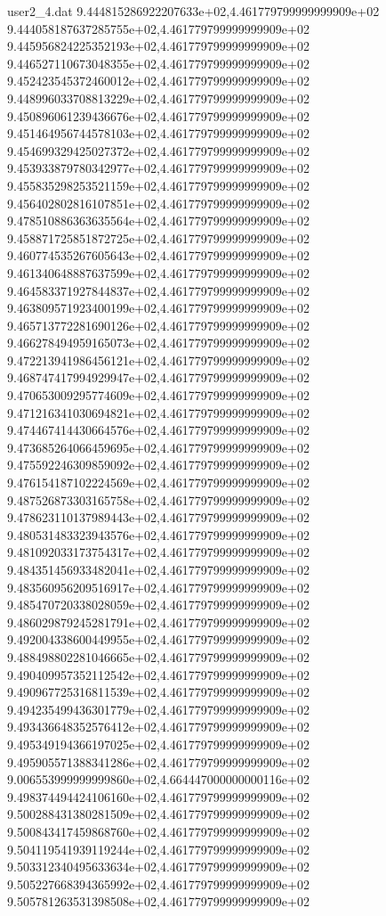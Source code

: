 \begin{filecontents}{user2_4.dat}
9.444815286922207633e+02,4.461779799999999909e+02
9.444058187637285755e+02,4.461779799999999909e+02
9.445956824225352193e+02,4.461779799999999909e+02
9.446527110673048355e+02,4.461779799999999909e+02
9.452423545372460012e+02,4.461779799999999909e+02
9.448996033708813229e+02,4.461779799999999909e+02
9.450896061239436676e+02,4.461779799999999909e+02
9.451464956744578103e+02,4.461779799999999909e+02
9.454699329425027372e+02,4.461779799999999909e+02
9.453933879780342977e+02,4.461779799999999909e+02
9.455835298253521159e+02,4.461779799999999909e+02
9.456402802816107851e+02,4.461779799999999909e+02
9.478510886363635564e+02,4.461779799999999909e+02
9.458871725851872725e+02,4.461779799999999909e+02
9.460774535267605643e+02,4.461779799999999909e+02
9.461340648887637599e+02,4.461779799999999909e+02
9.464583371927844837e+02,4.461779799999999909e+02
9.463809571923400199e+02,4.461779799999999909e+02
9.465713772281690126e+02,4.461779799999999909e+02
9.466278494959165073e+02,4.461779799999999909e+02
9.472213941986456121e+02,4.461779799999999909e+02
9.468747417994929947e+02,4.461779799999999909e+02
9.470653009295774609e+02,4.461779799999999909e+02
9.471216341030694821e+02,4.461779799999999909e+02
9.474467414430664576e+02,4.461779799999999909e+02
9.473685264066459695e+02,4.461779799999999909e+02
9.475592246309859092e+02,4.461779799999999909e+02
9.476154187102224569e+02,4.461779799999999909e+02
9.487526873303165758e+02,4.461779799999999909e+02
9.478623110137989443e+02,4.461779799999999909e+02
9.480531483323943576e+02,4.461779799999999909e+02
9.481092033173754317e+02,4.461779799999999909e+02
9.484351456933482041e+02,4.461779799999999909e+02
9.483560956209516917e+02,4.461779799999999909e+02
9.485470720338028059e+02,4.461779799999999909e+02
9.486029879245281791e+02,4.461779799999999909e+02
9.492004338600449955e+02,4.461779799999999909e+02
9.488498802281046665e+02,4.461779799999999909e+02
9.490409957352112542e+02,4.461779799999999909e+02
9.490967725316811539e+02,4.461779799999999909e+02
9.494235499436301779e+02,4.461779799999999909e+02
9.493436648352576412e+02,4.461779799999999909e+02
9.495349194366197025e+02,4.461779799999999909e+02
9.495905571388341286e+02,4.461779799999999909e+02
9.006553999999999860e+02,4.664447000000000116e+02
9.498374494424106160e+02,4.461779799999999909e+02
9.500288431380281509e+02,4.461779799999999909e+02
9.500843417459868760e+02,4.461779799999999909e+02
9.504119541939119244e+02,4.461779799999999909e+02
9.503312340495633634e+02,4.461779799999999909e+02
9.505227668394365992e+02,4.461779799999999909e+02
9.505781263531398508e+02,4.461779799999999909e+02

\end{filecontents}
